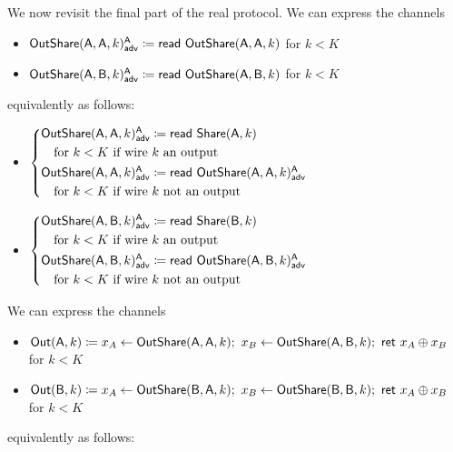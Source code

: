\noindent We now revisit the final part of the real protocol. We can express the channels
\begin{itemize}
\item {\color{blue} $\mathsf{OutShare}(\mathsf{A},\mathsf{A},k)^{\mathsf{A}}_{\mathsf{adv}} \coloneqq \mathsf{read} \ \mathsf{OutShare}(\mathsf{A},\mathsf{A},k)$ for $k < K$}
\item {\color{blue} $\mathsf{OutShare}(\mathsf{A},\mathsf{B},k)^{\mathsf{A}}_{\mathsf{adv}} \coloneqq \mathsf{read} \ \mathsf{OutShare}(\mathsf{A},\mathsf{B},k)$ for $k < K$}
\end{itemize}
equivalently as follows:
\begin{itemize}
\item {\color{blue} $\begin{cases*} \LeakOutShare(\A,\A,k)^\A_\adv \coloneqq \read{\Share(\A,k)} \\ \hspace{10pt} \text{for $k < K$ if wire $k$ an output} \\ \LeakOutShare(\A,\A,k)^\A_\adv \coloneqq \read{\LeakOutShare(\A,\A,k)^\A_\adv} \\ \hspace{10pt} \text{for $k < K$ if wire $k$ not an output} \end{cases*}$}
\item {\color{blue} $\begin{cases*} \LeakOutShare(\A,\B,k)^\A_\adv \coloneqq \read{\Share(\B,k)} \\ \hspace{10pt} \text{for $k < K$ if wire $k$ an output} \\ \LeakOutShare(\A,\B,k)^\A_\adv \coloneqq \read{\LeakOutShare(\A,\B,k)^\A_\adv} \\ \hspace{10pt} \text{for $k < K$ if wire $k$ not an output} \end{cases*}$}
\end{itemize}
We can express the channels
\begin{itemize}
\item $\mathsf{Out}(\mathsf{A},k) \coloneqq x_A \leftarrow \mathsf{OutShare}(\mathsf{A},\mathsf{A},k); \ x_B \leftarrow \mathsf{OutShare}(\mathsf{A},\mathsf{B},k); \ \mathsf{ret} \ x_A \oplus x_B$ for $k < K$
\item $\mathsf{Out}(\mathsf{B},k) \coloneqq x_A \leftarrow \mathsf{OutShare}(\mathsf{B},\mathsf{A},k); \ x_B \leftarrow \mathsf{OutShare}(\mathsf{B},\mathsf{B},k); \ \mathsf{ret} \ x_A \oplus x_B$ for $k < K$
\end{itemize}
equivalently as follows:
